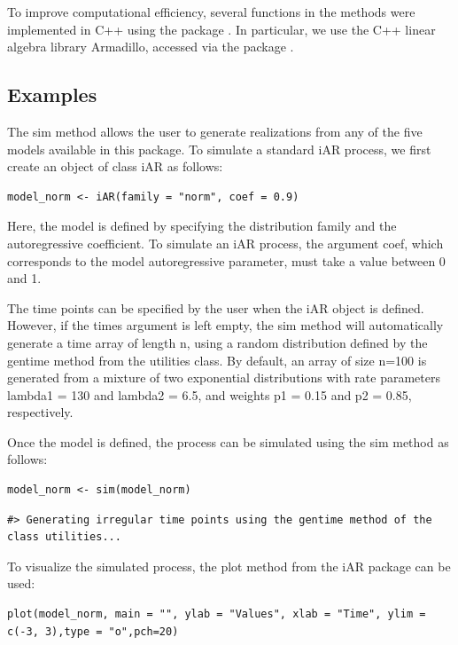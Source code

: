 To improve computational efficiency, several functions in the methods were implemented in C++ using the package  \citep{Rcpp}. In particular, we use the C++ linear algebra library Armadillo, accessed via the  package \citep{RcppArmadillo}.

\subsection{Examples}\label{examples}

The sim method allows the user to generate realizations from any of the five models available in this package. To simulate a standard iAR process, we first create an object of class iAR as follows:

\begin{verbatim}
model_norm <- iAR(family = "norm", coef = 0.9) 
\end{verbatim}

Here, the model is defined by specifying the distribution family and the autoregressive coefficient. To simulate an iAR process, the argument coef, which corresponds to the model autoregressive parameter, must take a value between 0 and 1.

The time points can be specified by the user when the iAR object is defined. However, if the times argument is left empty, the sim method will automatically generate a time array of length n, using a random distribution defined by the gentime method from the utilities class. By default, an array of size n=100 is generated from a mixture of two exponential distributions with rate parameters lambda1 = 130 and lambda2 = 6.5, and weights p1 = 0.15 and p2 = 0.85, respectively.

Once the model is defined, the process can be simulated using the sim method as follows:

\begin{verbatim}
model_norm <- sim(model_norm) 
\end{verbatim}

\begin{verbatim}
#> Generating irregular time points using the gentime method of the class utilities...
\end{verbatim}

To visualize the simulated process, the plot method from the iAR package can be used:

\begin{verbatim}
plot(model_norm, main = "", ylab = "Values", xlab = "Time", ylim = c(-3, 3),type = "o",pch=20)
\end{verbatim}

